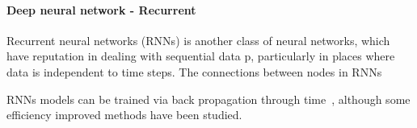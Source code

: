 \paragraph{Deep neural network - Recurrent}
Recurrent neural networks (RNNs) is another class of neural networks, which have reputation in dealing with sequential data p, particularly in places where data is independent to time steps. The connections between nodes in RNNs 


RNNs models can be trained via back propagation through time~\cite{Goodfellow-et-al-2016}, although some efficiency improved methods have been studied.~\cite{963769,neco.1989,Gomez:2008:ANE:1390681.1390712}